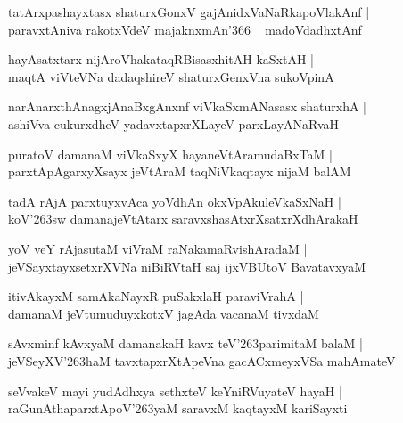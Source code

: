 \documentclass[twoside,12pt,openright]{book}
\def\S{\char'263}
\newcounter{shloka}[chapter]
\begin{document}
\begin{shloka}%
tatArxpashayxtasx shaturxGonxV gajAnidxVaNaRkapoVlakAnf |\\
paravxtAniva rakotxVdeV majaknxmAn\char'366 ~ madoVdadhxtAnf
\end{shloka}

\begin{shloka}%
hayAsatxtarx nijAroVhakataqRBisasxhitAH kaSxtAH |\\
maqtA viVteVNa dadaqshireV shaturxGenxVna sukoVpinA 
\end{shloka}

\begin{shloka}%
narAnarxthAnagxjAnaBxgAnxnf viVkaSxmANasasx shaturxhA |\\
ashiVva cukurxdheV yadavxtapxrXLayeV parxLayANaRvaH 
\end{shloka}

\begin{shloka}%
puratoV damanaM viVkaSxyX hayaneVtAramudaBxTaM |\\
parxtApAgarxyXsayx jeVtAraM taqNiVkaqtayx nijaM balAM 
\end{shloka}

\begin{shloka}%
tadA rAjA parxtuyxvAca yoVdhAn okxVpAkuleVkaSxNaH |\\
koV\S sw damanajeVtAtarx saravxshasAtxrXsatxrXdhArakaH 
\end{shloka}

\begin{shloka}%
yoV veY rAjasutaM viVraM raNakamaRvishAradaM |\\
jeVSayxtayxsetxrXVNa niBiRVtaH saj ijxVBUtoV BavatavxyaM 
\end{shloka}

\begin{shloka}%
itivAkayxM samAkaNayxR puSakxlaH paraviVrahA |\\
damanaM jeVtumuduyxkotxV jagAda vacanaM tivxdaM 
\end{shloka}

\begin{shloka}%
sAvxminf kAvxyaM damanakaH kavx teV\S parimitaM balaM |\\
jeVSeyXV\S haM tavxtapxrXtApeVna gacACxmeyxVSa mahAmateV 
\end{shloka}

\begin{shloka}%
seVvakeV mayi yudAdhxya sethxteV keYniRVuyateV hayaH |\\
raGunAthaparxtApoV\S yaM saravxM kaqtayxM kariSayxti
\end{shloka}
\end{document}
